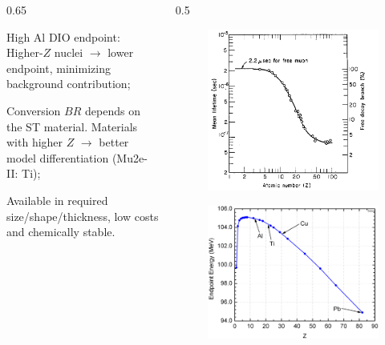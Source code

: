 \documentclass{beamer}
\begin{document}
\begin{frame}
\begin{columns}
\begin{column}{0.65\framewidth}
\begin{itemize}
{\vspace{3mm}
\item High Al DIO endpoint: Higher-$Z$ nuclei $\rightarrow$ lower endpoint, minimizing background contribution;
\vspace{3mm}
\item Conversion $BR$ depends on the ST material. Materials with higher $Z$ $\rightarrow$ better model differentiation (Mu2e-II: Ti);
\vspace{3mm}
\item Available in required size/shape/thickness, low costs and chemically stable.}
    \end{itemize}
\end{column}   
 \begin{column}{0.5\framewidth}
    \begin{figure}[!h]
        \centering
        \includegraphics[width=0.8\columnwidth]{figures/png/lifetime_mu_matter.png}
        \label{fig:muonicatom}
 \end{figure}
       \begin{figure}[!h]
        \centering
        \includegraphics[width=0.8\columnwidth]{figures/png/endopint.png}
        \label{fig:endpoint}
    \label{fig:2imins}
  \end{figure}
\end{column}   
\end{columns}

\end{frame}
\end{document}
